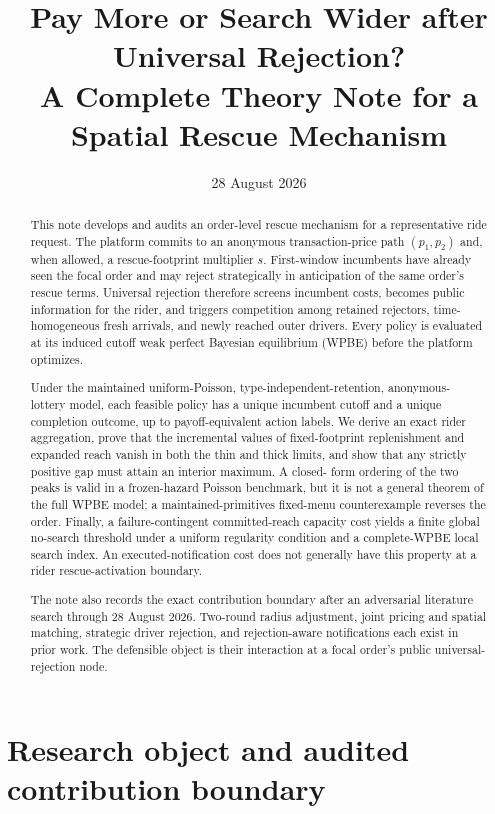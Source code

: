 \documentclass[11pt]{article}
\title{\bfseries Pay More or Search Wider after Universal Rejection?\\
\large A Complete Theory Note for a Spatial Rescue Mechanism}
\author{}
\date{28 August 2026}
\theoremstyle{definition}
\theoremstyle{remark}
\begin{document}
\maketitle

\begin{abstract}
This note develops and audits an order-level rescue mechanism for a
representative ride request.  The platform commits to an anonymous
transaction-price path $(p_1,p_2)$ and, when allowed, a rescue-footprint
multiplier $s$.  First-window incumbents have already seen the focal order and
may reject strategically in anticipation of the same order's rescue terms.
Universal rejection therefore screens incumbent costs, becomes public
information for the rider, and triggers competition among retained rejectors,
time-homogeneous fresh arrivals, and newly reached outer drivers.  Every
policy is evaluated at its induced cutoff weak perfect Bayesian equilibrium
(WPBE) before the platform optimizes.

Under the maintained uniform-Poisson, type-independent-retention, anonymous-
lottery model, each feasible policy has a unique incumbent cutoff and a unique
completion outcome, up to payoff-equivalent action labels.  We derive an exact
rider aggregation, prove that the incremental values of fixed-footprint
replenishment and expanded reach vanish in both the thin and thick limits, and
show that any strictly positive gap must attain an interior maximum.  A closed-
form ordering of the two peaks is valid in a frozen-hazard Poisson benchmark,
but it is not a general theorem of the full WPBE model; a maintained-primitives
fixed-menu counterexample reverses the order.  Finally, a failure-contingent
committed-reach capacity cost yields a finite global no-search threshold under
a uniform regularity condition and a complete-WPBE local search index.  An
executed-notification cost does not generally have this property at a rider
rescue-activation boundary.

The note also records the exact contribution boundary after an adversarial
literature search through 28 August 2026.  Two-round radius adjustment, joint
pricing and spatial matching, strategic driver rejection, and rejection-aware
notifications each exist in prior work.  The defensible object is their
interaction at a focal order's public universal-rejection node.
\end{abstract}

\section{Research object and audited contribution boundary}
\end{document}
